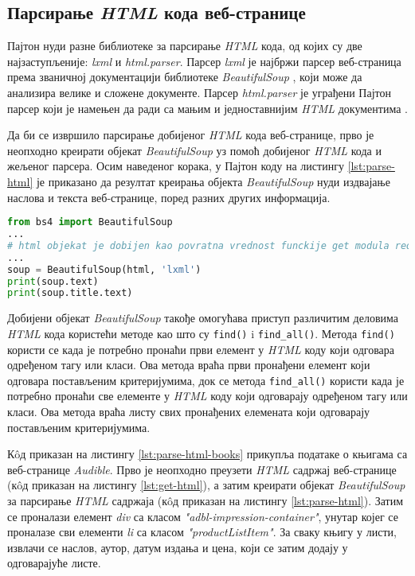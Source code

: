 \documentclass[12pt,oneside]{memoir}
\begin{document}
\subsection{Парсирање \textit{HTML} кода веб-странице}
Пајтон нуди разне библиотеке за парсирање \textit{HTML} кода, од којих су две најзаступљеније: \textit{lxml} и \textit{html.parser}. Парсер \textit{lxml} је најбржи парсер веб-страница према званичној документацији библиотеке \textit{BeautifulSoup} \cite{beautifulSoapDocs}, који може да анализира велике и сложене документе. Парсер \textit{html.parser} је уграђени Пајтон парсер који је намењен да ради са мањим и једноставнијим \textit{HTML} документима \cite{WebScrapingWithPython}.

Да би се извршило парсирање добијеног \textit{HTML} кода веб-странице, прво је неопходно креирати објекат \textit{BeautifulSoup} уз помоћ добијеног \textit{HTML} кода и жељеног парсера. Осим наведеног корака, у Пајтон коду на листингу \ref{lst:parse-html} је приказано да резултат креирања објекта \textit{BeautifulSoup} нуди издвајање наслова и текста веб-странице, поред разних других информација.

\begin{lstlisting}[language=Python, caption={Креирање објекта \textit{BeautifulSoup}}, label={lst:parse-html}]
from bs4 import BeautifulSoup
...
# html objekat je dobijen kao povratna vrednost funckije get modula requests
...
soup = BeautifulSoup(html, 'lxml')
print(soup.text)
print(soup.title.text)
\end{lstlisting}

Добијени објекат \textit{BeautifulSoup} такође омогућава приступ различитим деловима \textit{HTML} кода користећи методе као што су \texttt{find()} i \texttt{find\_all()}. Метода \texttt{find()} користи се када је потребно пронаћи први елемент у \textit{HTML} коду који одговара одређеном тагу или класи. Ова метода враћа први пронађени елемент који одговара постављеним критеријумима, док се метода \texttt{find\_all()} користи када је потребно пронаћи све елементе у \textit{HTML} коду који одговарају одређеном тагу или класи. Ова метода враћа листу свих пронађених елемената који одговарају постављеним критеријумима.

Кôд приказан на листингу \ref{lst:parse-html-books} прикупља податаке о књигама са веб-странице \textit{Audible}. Прво је неопходно преузети \textit{HTML} садржај веб-странице (кôд приказан на листингу \ref{lst:get-html}), а затим креирати објекат \textit{BeautifulSoup} за парсирање  \textit{HTML} садржаја (кôд приказан на листингу \ref{lst:parse-html}). Затим се проналази елемент \textit{div} са класом \textit{"adbl-impression-container"}, унутар којег се проналазе сви елементи \textit{li} са класом \textit{"productListItem"}. За сваку књигу у листи, извлачи се наслов, аутор, датум издања и цена, који се затим додају у одговарајуће листе.
\end{document}
